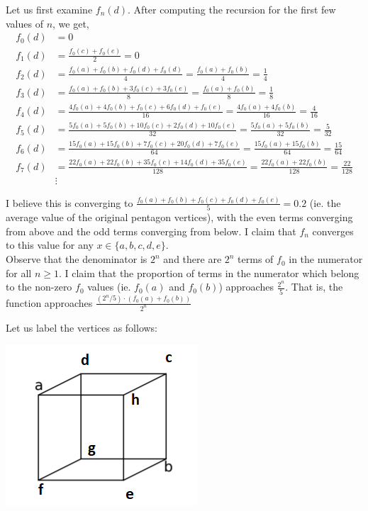 \documentclass[12pt]{article}
\newenvironment{problem}[2][Problem]{\begin{trivlist}
\item[\hskip \labelsep {\bfseries #1}\hskip \labelsep {\bfseries #2.}]}{\end{trivlist}}
\begin{document}
Let us first examine $f_n(d)$. After computing the recursion for the first few values of $n$, we get,
\begin{align*}
f_0(d) &= 0\\
f_1(d) &= \frac{f_0(c) + f_0(e)}{2} = 0\\
f_2(d) &= \frac{f_0(a) + f_0(b) +f_0(d) + f_0(d)}{4} = \frac{f_0(a) + f_0(b)}{4} = \frac{1}{4}\\
f_3(d) &= \frac{f_0(a) + f_0(b) + 3f_0(c) + 3f_0(e)}{8} = \frac{f_0(a) + f_0(b)}{8} = \frac{1}{8}\\
f_4(d) &= \frac{4f_0(a) + 4f_0(b) + f_0(c) + 6f_0(d) + f_0(e)}{16} = \frac{4f_0(a) + 4f_0(b)}{16} = \frac{4}{16}\\
f_5(d) &= \frac{5f_0(a) + 5f_0(b) + 10f_0(c) + 2f_0(d) + 10f_0(e)}{32} = \frac{5f_0(a) + 5f_0(b)}{32} = \frac{5}{32}\\
f_6(d) &= \frac{15f_0(a) + 15f_0(b) + 7f_0(c) + 20f_0(d) + 7f_0(e)}{64} = \frac{15f_0(a) + 15f_0(b)}{64} = \frac{15}{64}\\
f_7(d) &= \frac{22f_0(a) + 22f_0(b) + 35f_0(c) + 14f_0(d) + 35f_0(e)}{128} = \frac{22f_0(a) + 22f_0(b)}{128} = \frac{22}{128}\\
&\vdots
\end{align*}

I believe this is converging to $\frac{f_0(a) + f_0(b) + f_0(c) + f_0(d) + f_0(e)}{5} = 0.2$ (ie. the average value of the original pentagon vertices), with the even terms converging from above and the odd terms converging from below. I claim that $f_n$ converges to this value for any $x \in \{a, b, c, d, e\}$.\\

Observe that the denominator is $2^n$ and there are $2^n$ terms of $f_0$ in the numerator for all $n \geq 1$. I claim that the proportion of terms in the numerator which belong to the non-zero $f_0$ values (ie. $f_0(a)$ and $f_0(b)$) approaches $\frac{2^n}{5}$. That is, the function approaches $\frac{(2^n/5) \cdot (f_0(a) + f_0(b))}{2^n}$

\newpage
\begin{problem}{3}
\end{problem}

Let us label the vertices as follows:

\includegraphics{cube.png}
\end{document}
